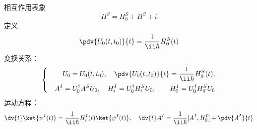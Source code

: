 相互作用表象
\[
    H^S = H^S_0 + H^S+i
\]
定义
\[
    \pdv{U_0(t,t_0)}{t} = \frac{1}{\ii \hbar} H^S_0(t)
\]
变换关系：
\begin{equation}
    \left\{ \quad
        \begin{aligned}
            U_0 = U_0(t,t_0), \quad \pdv{U_0(t,t_0)}{t} = \frac{1}{\ii \hbar} H^S_0(t), \\
            A^I = U_0^\dagger A^S U_0, \quad H_i^I = U_0^\dagger H_i^S U_0, \quad \quad H_0^I = U_0^\dagger H_0^S U_0
        \end{aligned}
    \right.
\end{equation}
运动方程：
\begin{equation}
    \dv{t} \ket{\psi^I(t)} = \frac{1}{\ii \hbar} H_i^I(t) \ket{\psi^I(t)}, \quad 
    \dv{t} A^I = \frac{1}{\ii \hbar} [A^I, H_0^I] + \pdv{A^I}{t}
\end{equation}
